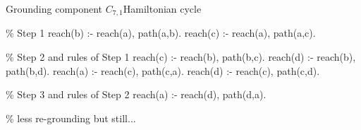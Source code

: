 \begin{frame}{Grounding component \(C_{7,1}\)}{Hamiltonian cycle}
\begin{SemiVerbatim}{.9}
{\color{comment}\% Step 1}
reach(b) :- \alert{reach(a)}, \alert{path(a,b)}.
reach(c) :- \alert{reach(a)}, \alert{path(a,c)}.

{\color{comment}\% Step 2 \alert{and} rules of Step 1}
reach(c) :- \alert{reach(b)}, path(b,c).
reach(d) :- \alert{reach(b)}, path(b,d).
reach(a) :- \alert{reach(c)}, path(c,a).
reach(d) :- \alert{reach(c)}, path(c,d).

{\color{comment}\% Step 3 \alert{and} rules of Step 2}
reach(a) :- \alert{reach(d)}, path(d,a).

{\color{comment}\% less re-grounding but still...}
\end{SemiVerbatim}
\end{frame}
%
